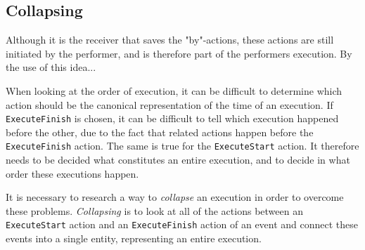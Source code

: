 	
	

	\subsection{Collapsing}
	Although it is the receiver that saves the "by"-actions, these actions are still initiated by the performer, and is therefore part of the performers execution. By the use of this idea...
		
	When looking at the order of execution, it can be difficult to determine which action should be the canonical representation of the time of an execution. If \texttt{ExecuteFinish} is chosen, it can be difficult to tell which execution happened before the other, due to the fact that related actions happen before the \texttt{ExecuteFinish} action. 
	The same is true for the \texttt{ExecuteStart} action. It therefore needs to be decided what constitutes an entire execution, and to decide in what order these executions happen.
	
	\newpar It is necessary to research a way to \textit{collapse} an execution in order to overcome these problems. \textit{Collapsing} is to look at all of the actions between an \texttt{ExecuteStart} action and an \texttt{ExecuteFinish} action of an event and connect these events into a single entity, representing an entire execution. 
	

